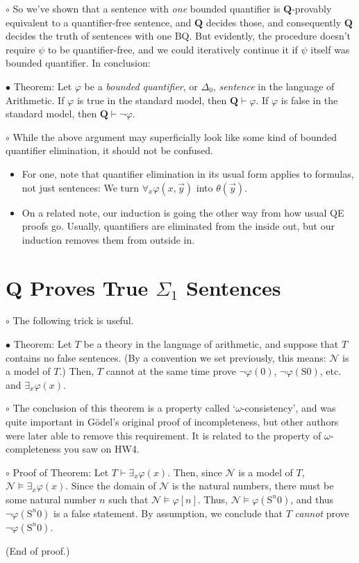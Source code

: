 \documentclass{article}
\newcommand{\RQ}{\mathbf{Q}}
\newcommand{\TN}{\mathcal{N}}
\newcommand{\suc}{\mathrm{S}}
\newcommand\Point[1]{\noindent \hspace{\labelsep} {\large $\bullet$ #1} \smallskip}
\newcommand\point[1]{\noindent \hspace{\labelsep} {\small $\circ$ #1} \smallskip}
\newcommand\timestamp[1]{}
\newcommand\proofend{\hfill(End of proof.)}
\begin{document}
\point{So we've shown that a sentence with \emph{one} bounded quantifier is $\RQ$-provably equivalent to a quantifier-free sentence, and $\RQ$ decides those, and consequently $\RQ$ decides the truth of sentences with one BQ. But evidently, the procedure doesn't require $\psi$ to be quantifier-free, and we could iteratively continue it if $\psi$ itself was bounded quantifier. In conclusion:}

\Point{Theorem: Let $\varphi$ be a \emph{bounded quantifier}, or $\Delta_0$, \emph{sentence} in the language of Arithmetic. If $\varphi$ is true in the standard model, then $\RQ \vdash \varphi$. If $\varphi$ is false in the standard model, then $\RQ \vdash \neg\varphi$.}

\point{While the above argument may superficially look like some kind of bounded quantifier elimination, it should not be confused.
\begin{itemize}
\item For one, note that quantifier elimination in its usual form applies to formulas, not just sentences: We turn $\forall_x \varphi(x,\vec y)$ into $\theta(\vec y)$.
\item On a related note, our induction is going the other way from how usual QE proofs go. Usually, quantifiers are eliminated from the inside out, but our induction removes them from outside in.
\end{itemize}}

\timestamp{55 min}

\section{$\RQ$ Proves True $\Sigma_1$ Sentences}

\point{The following trick is useful.}

\Point{Theorem: Let $T$ be a theory in the language of arithmetic, and suppose that $T$ contains no false sentences. (By a convention we set previously, this means: $\TN$ is a model of $T$.) Then, $T$ cannot at the same time prove $\neg\varphi(0)$, $\neg\varphi(\suc 0)$, etc. and $\exists_x \varphi(x)$.}

\point{The conclusion of this theorem is a property called `$\omega$-consistency', and was quite important in Gödel's original proof of incompleteness, but other authors were later able to remove this requirement. It is related to the property of $\omega$-completeness you saw on HW4.}

\point{Proof of Theorem: Let $T \vdash \exists_x \varphi(x)$. Then, since $\TN$ is a model of $T$, $\TN \vDash \exists_x \varphi(x)$. Since the domain of $\TN$ is the natural numbers, there must be some natural number $n$ such that $\TN \vDash \varphi[n]$. Thus, $\TN \vDash \varphi(\suc^n 0)$, and thus $\neg\varphi(\suc^n 0)$ is a false statement. By assumption, we conclude that $T$ \emph{cannot} prove $\neg\varphi(\suc^n 0)$.

\proofend}
\end{document}
